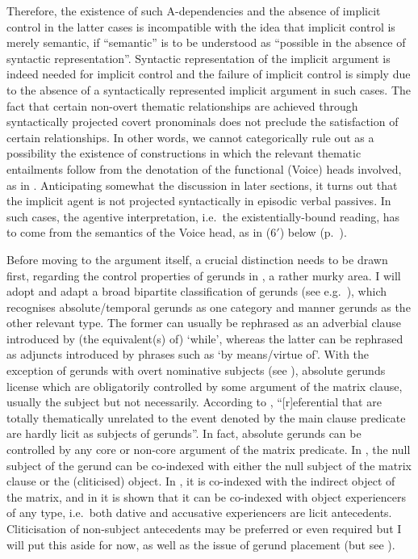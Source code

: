 \documentclass[output=paper]{langsci/langscibook}
\begin{document}
Therefore, the existence of such A-dependencies and the absence of implicit
control in the latter cases is incompatible with the idea that implicit control is merely
semantic, if \enquote{semantic} is to be understood as \enquote{possible in the
    absence of syntactic representation}. Syntactic representation of the
    implicit argument is indeed needed for implicit control and the failure of
    implicit control is simply due to the absence of a syntactically
    represented implicit argument in such cases. The fact that certain
    non-overt thematic relationships are achieved through syntactically
    projected covert pronominals does not preclude the satisfaction of certain
    relationships. In other words, we cannot categorically rule out as a
    possibility the existence of constructions in which the relevant thematic
    entailments follow from the denotation of the functional (Voice) heads
    involved, as in \textcite{SpathasEtAl2015}. Anticipating somewhat the discussion in
    later sections, it turns out that the implicit agent is not projected
    syntactically in  episodic verbal passives. In such
    cases, the agentive interpretation, i.e.\ the existentially-bound reading,
    has to come from the semantics of the Voice head, as in (6$'$) below
    (p.~\pageref{ex:22.6prime}).

Before moving to the argument itself, a crucial distinction needs to be drawn
first, regarding the control properties of gerunds in , a rather murky
area.  I will adopt and adapt a broad bipartite classification of  gerunds
(see e.g.\ \citealt{Tsimpli2000}), which recognises absolute/temporal gerunds as
one category and manner gerunds as the other relevant type. The former can
usually be rephrased as an adverbial clause introduced by (the equivalent(s)
of) ‘while’, whereas the latter can be rephrased as adjuncts introduced by
phrases such as `by means/virtue of'. With the exception of gerunds with overt
nominative subjects (see \citealt{Tzartzanos1946,Kotzoglou2016}),
absolute gerunds license  which are obligatorily controlled by
some argument of the matrix clause, usually the subject but not necessarily.
According to \citet{Kotzoglou2016}, “[r]eferential  that are
totally thematically unrelated to the event denoted by the main clause
predicate are hardly licit as subjects of gerunds”.  In fact, absolute gerunds
can be controlled by any core or non-core argument of the matrix predicate. In
, the null subject of the gerund can be co-indexed with either
the null subject of the matrix clause or the (cliticised) object. In
, it is co-indexed with the indirect object of the matrix, and
in  it is shown that it can be co-indexed with object
experiencers of any type, i.e.\ both dative and accusative experiencers are
licit antecedents. Cliticisation of non-subject antecedents may be preferred or
even required but I will put this aside for now, as well as the issue of gerund
placement (but see \citealt{HaidouSitaridou2002}).\largerpage[2]
\end{document}
